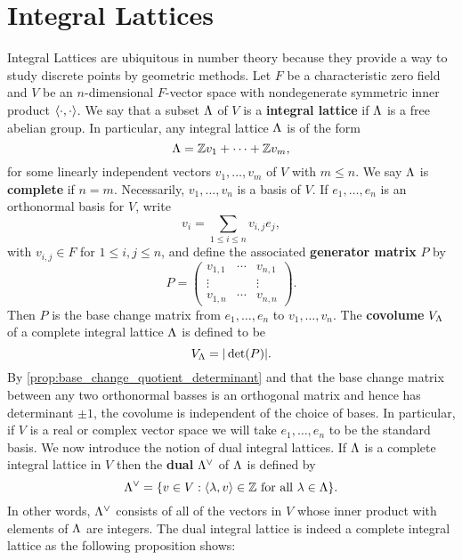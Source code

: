   \section{Integral Lattices}
    Integral Lattices are ubiquitous in number theory because they provide a way to study discrete points by geometric methods. Let $F$ be a characteristic zero field and $V$ be an $n$-dimensional $F$-vector space with nondegenerate symmetric inner product $\langle\cdot,\cdot\rangle$. We say that a subset $\Lambda$ of $V$ is a \textbf{integral lattice} if $\Lambda$ is a free abelian group. In particular, any integral lattice $\Lambda$ is of the form
    \[
      \Lambda = \mathbb{Z} v_{1}+\cdots+\mathbb{Z} v_{m},
    \]
    for some linearly independent vectors $v_{1},\ldots,v_{m}$ of $V$ with $m \le n$. We say $\Lambda$ is \textbf{complete} if $n = m$. Necessarily, $v_{1},\ldots,v_{n}$ is a basis of $V$. If $e_{1},\ldots,e_{n}$ is an orthonormal basis for $V$, write
    \[
      v_{i} = \sum_{1 \le i \le n}v_{i,j}e_{j},
    \]
    with $v_{i,j} \in F$ for $1 \le i,j \le n$, and define the associated \textbf{generator matrix} $P$ by
    \[
      P = \begin{pmatrix} v_{1,1} & \cdots & v_{n,1} \\ \vdots & & \vdots \\ v_{1,n} & \cdots & v_{n,n} \end{pmatrix}.
    \]
    Then $P$ is the base change matrix from $e_{1},\ldots,e_{n}$ to $v_{1},\ldots,v_{n}$. The \textbf{covolume} $V_{\Lambda}$ of a complete integral lattice $\Lambda$ is defined to be
    \[
      V_{\Lambda} = |\det(P)|.
    \]
    By \cref{prop:base_change_quotient_determinant} and that the base change matrix between any two orthonormal basses is an orthogonal matrix and hence has determinant $\pm 1$, the covolume is independent of the choice of bases. In particular, if $V$ is a real or complex vector space we will take $e_{1},\ldots,e_{n}$ to be the standard basis. We now introduce the notion of dual integral lattices. If $\Lambda$ is a complete integral lattice in $V$ then the \textbf{dual} $\Lambda^{\vee}$ of $\Lambda$ is defined by
    \[
      \Lambda^{\vee} = \{v \in V:\text{$\langle\lambda,v\rangle \in \mathbb{Z}$ for all $\lambda \in \Lambda$}\}.
    \]
    In other words, $\Lambda^{\vee}$ consists of all of the vectors in $V$ whose inner product with elements of $\Lambda$ are integers. The dual integral lattice is indeed a complete integral lattice as the following proposition shows:


